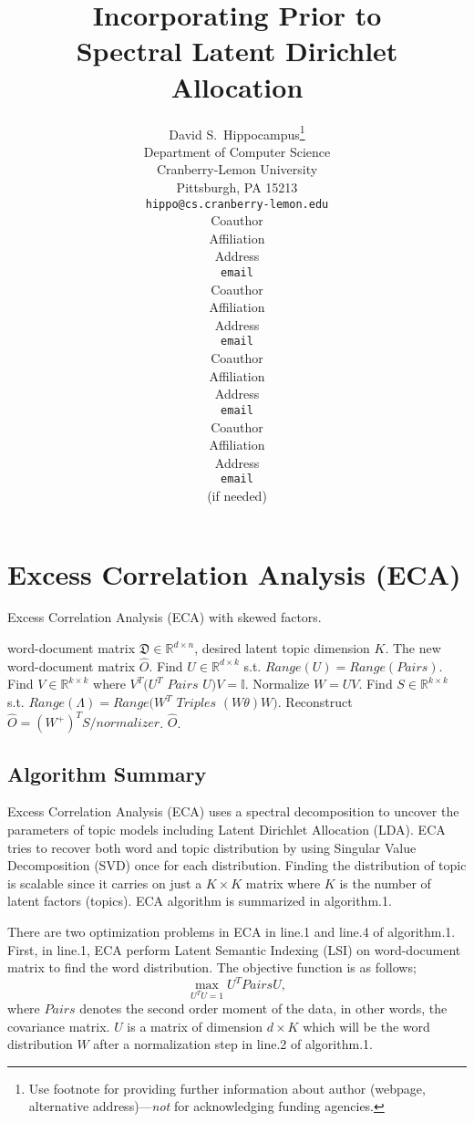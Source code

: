 \documentclass{article}
\title{Incorporating Prior to \\ Spectral Latent Dirichlet Allocation}
\author{
David S.~Hippocampus\thanks{ Use footnote for providing further information
about author (webpage, alternative address)---\emph{not} for acknowledging
funding agencies.} \\
Department of Computer Science\\
Cranberry-Lemon University\\
Pittsburgh, PA 15213 \\
\texttt{hippo@cs.cranberry-lemon.edu} \\
\And
Coauthor \\
Affiliation \\
Address \\
\texttt{email} \\
\AND
Coauthor \\
Affiliation \\
Address \\
\texttt{email} \\
\And
Coauthor \\
Affiliation \\
Address \\
\texttt{email} \\
\And
Coauthor \\
Affiliation \\
Address \\
\texttt{email} \\
(if needed)\\
}
\begin{document}
\maketitle





\section{Excess Correlation Analysis (ECA)}

\begin{algorithm}
\caption{Excess Correlation Analysis (ECA) with skewed factors.}
\begin{algorithmic}[1]
\REQUIRE word-document matrix $ \mathfrak{D} \in \mathbb{R}^{d \times n}$, desired latent topic dimension $K$.
\ENSURE  The new word-document matrix $\hat{O}$.
\STATE  Find $ U \in \mathbb{R}^{d \times k}$   s.t. $Range(U) = Range(Pairs)$.
\STATE  Find $ V \in \mathbb{R}^{k \times k}$   where $V^T(U^T$ $Pairs$ $U)V = \mathbb{I}$.
\STATE  Normalize $W = UV$.
\STATE  Find $S \in \mathbb{R}^{k \times k}$   s.t. $Range(\Lambda) = Range(W^T$ $Triples$ $(W\theta)W)$.
\STATE  Reconstruct $\hat{O} =( W^+)^TS / normalizer$.
\RETURN $\hat{O}$.
\end{algorithmic}
\end{algorithm}

\subsection{Algorithm Summary}

Excess Correlation Analysis (ECA) \cite{anandkumar2012spectral} uses a spectral decomposition to uncover the parameters of topic models including Latent Dirichlet Allocation (LDA). ECA tries to recover both word and topic distribution by using Singular Value Decomposition (SVD) once for each distribution. Finding the distribution of topic is scalable since it carries on just a $K \times K$ matrix where $K$ is the number of latent factors (topics). ECA algorithm is summarized in algorithm.1.

There are two optimization problems in ECA in line.1 and line.4 of algorithm.1. First, in line.1, ECA perform Latent Semantic Indexing (LSI) on word-document matrix to find the word distribution. The objective function is as follows;
\begin{equation}
\max_{U^TU = 1} U^T Pairs U,
\end{equation}
where $Pairs$ denotes the second order moment of the data, in other words, the covariance matrix. $U$ is a matrix of dimension $d \times K$ which will be the word distribution $W$ after a normalization step in line.2 of algorithm.1.
\end{document}
